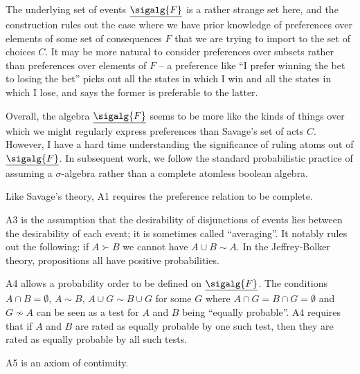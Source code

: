 The underlying set of events $\underline{\sigalg{F}}$ is a rather strange set here, and the construction rules out the case where we have prior knowledge of preferences over elements of some set of consequences $F$ that we are trying to import to the set of choices $C$. It may be more natural to consider preferences over subsets rather than preferences over elements of $F$ -- a preference like ``I prefer winning the bet to losing the bet'' picks out all the states in which I win and all the states in which I lose, and says the former is preferable to the latter. 

Overall, the algebra $\underline{\sigalg{F}}$ seems to be more like the kinds of things over which we might regularly express preferences than Savage's set of acts $C$.  However, I have a hard time understanding the significance of ruling atoms out of $\underline{\sigalg{F}}$. In subsequent work, we follow the standard probabilistic practice of assuming a $\sigma$-algebra rather than a complete atomless boolean algebra.

Like Savage's theory, A1 requires the preference relation to be complete.

A3 is the assumption that the desirability of disjunctions of events lies between the desirability of each event; it is sometimes called ``averaging''. It notably rules out the following: if $A\succ B$ we cannot have $A\cup B\sim A$. In the Jeffrey-Bolker theory, propositions all have positive probabilities.

A4 allows a probability order to be defined on $\underline{\sigalg{F}}$. The conditions $A\cap B=\emptyset$, $A\sim B$, $A\cup G\sim B\cup G$ for some $G$ where $A\cap G=B\cap G=\emptyset$ and $G\not\sim A$ can be seen as a test for $A$ and $B$ being ``equally probable''. A4 requires that if $A$ and $B$ are rated as equally probable by one such test, then they are rated as equally probable by all such tests.

A5 is an axiom of continuity.